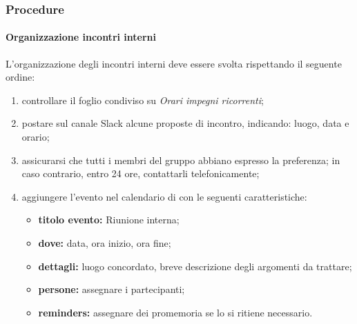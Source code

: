         \subsubsection{Procedure}
	        \paragraph{Organizzazione incontri interni}
	        \label{sec:incontri_interni}
	        L'organizzazione degli incontri interni deve essere svolta rispettando il seguente ordine:
	        \begin{enumerate}
	        	\item controllare il foglio condiviso su  \textit{Orari impegni ricorrenti};
	        	\item postare sul canale Slack  alcune proposte di incontro, indicando: luogo, data e orario;
	        	\item assicurarsi che tutti i membri del gruppo abbiano espresso la preferenza; in caso contrario, entro 24 ore, contattarli telefonicamente;
	        	\item aggiungere l'evento nel calendario di  con le seguenti caratteristiche:
	        	\begin{itemize}
	        		\item \textbf{titolo evento:} Riunione interna;
	        		\item \textbf{dove:} data, ora inizio, ora fine;
	        		\item \textbf{dettagli:} luogo concordato, breve descrizione degli argomenti da trattare;
	        		\item \textbf{persone:} assegnare i partecipanti;
	        		\item \textbf{reminders:} assegnare dei promemoria se lo si ritiene necessario.
	        	\end{itemize}
	        \end{enumerate}
